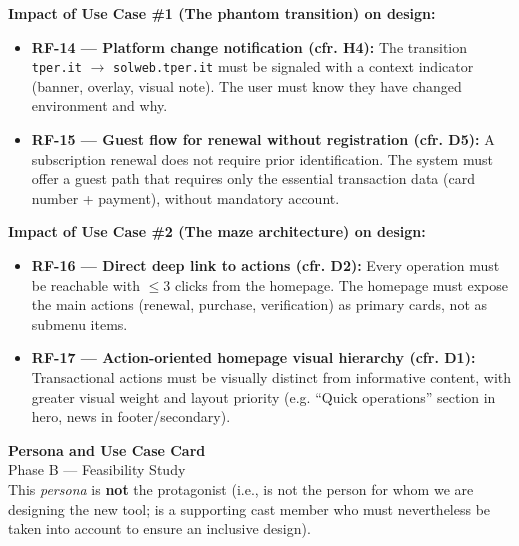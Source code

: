 ﻿\documentclass[11pt,a4paper]{article}
\begin{document}
\vspace{0.3cm}

\begin{tcolorbox}[base]
    {\small
    \textbf{Impact of Use Case \#1 (The phantom transition) on design:} \\[4pt]
    \begin{itemize}[leftmargin=*]
        \item \textbf{RF-14 --- Platform change notification (cfr. H4):} The transition \texttt{tper.it} $\rightarrow$ \texttt{solweb.tper.it} must be signaled with a context indicator (banner, overlay, visual note). The user must know they have changed environment and why.

        \item \textbf{RF-15 --- Guest flow for renewal without registration (cfr. D5):} A subscription renewal does not require prior identification. The system must offer a guest path that requires only the essential transaction data (card number + payment), without mandatory account.
    \end{itemize}
    \vspace{0.2cm}
    \textbf{Impact of Use Case \#2 (The maze architecture) on design:} \\[4pt]
    \begin{itemize}[leftmargin=*]
        \item \textbf{RF-16 --- Direct deep link to actions (cfr. D2):} Every operation must be reachable with $\leq$3 clicks from the homepage. The homepage must expose the main actions (renewal, purchase, verification) as primary cards, not as submenu items.

        \item \textbf{RF-17 --- Action-oriented homepage visual hierarchy (cfr. D1):} Transactional actions must be visually distinct from informative content, with greater visual weight and layout priority (e.g. ``Quick operations'' section in hero, news in footer/secondary).
    \end{itemize}
    }
\end{tcolorbox}

\begin{center}
    {\color{primaryColor}\Large\bfseries Persona and Use Case Card} \\[4pt]
    {\color{secondaryColor}\normalsize Phase B --- Feasibility Study} \\[4pt]
    {\color{secondaryColor}\small This \textit{persona} is \textbf{not} the protagonist (i.e., is not the person for whom we are designing the new tool; is a supporting cast member who must nevertheless be taken into account to ensure an inclusive design).}
\end{center}
\end{document}
